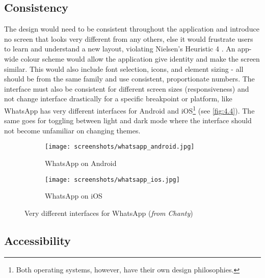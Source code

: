 \documentclass[../main.tex]{subfiles}
\begin{document}
\subsection{Consistency}

The design would need to be consistent throughout the application and introduce no screen that looks very different from any others, else it would frustrate users to learn and understand a new layout, violating Nielsen's Heuristic 4 \cite{experience10UsabilityHeuristics}. An app-wide colour scheme would allow the application give identity and make the screen similar. This would also include font selection, icons, and element sizing - all should be from the same family and use consistent, proportionate numbers. The interface must also be consistent for different screen sizes (responsiveness) and not change interface drastically for a specific breakpoint or platform, like WhatsApp has very different interfaces for Android and iOS\footnote{Both operating systems, however, have their own design philosophies.} (see \ref{fig:4.4}). The same goes for toggling between light and dark mode where the interface should not become unfamiliar on changing themes.

\begin{figure}
    \centering
    \noindent\begin{subfigure}{.49\textwidth}
    \centering
    \texttt{[image: screenshots/whatsapp\_android.jpg]}
    \caption{WhatsApp on Android}
    \end{subfigure}\hfill
    \begin{subfigure}{.49\textwidth}
    \centering
    \texttt{[image: screenshots/whatsapp\_ios.jpg]}
    \caption{WhatsApp on iOS}
    \end{subfigure}
    \caption{Very different interfaces for WhatsApp (\textit{from Chanty})}%
\end{figure}

\subsection{Accessibility}
\end{document}
